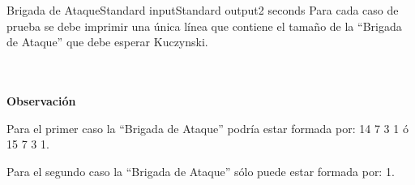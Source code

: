 \begin{problem}{Brigada de Ataque}{Standard input}{Standard output}{2 seconds}
\OutputFile
Para cada caso de prueba se debe imprimir una única línea que contiene el tamaño de la ``Brigada de Ataque'' que debe esperar Kuczynski.

\Example

\begin{example}
\end{example}

~\\ \\
\textbf{\Large{\textsf{Observación}}}

Para el primer caso la ``Brigada de Ataque'' podría estar formada por: 14 7 3 1 ó 15 7 3 1.

Para el segundo caso la ``Brigada de Ataque'' sólo puede estar formada por: 1.

\end{problem}
